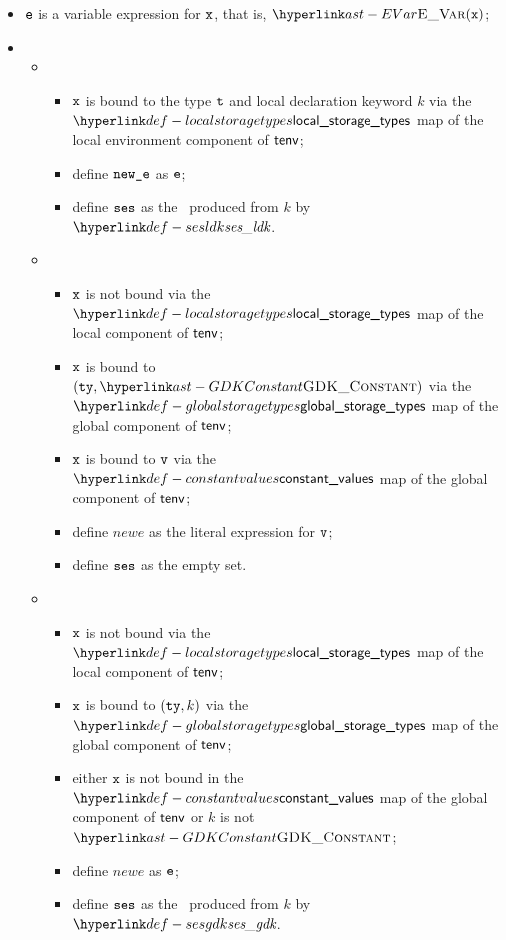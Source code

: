 \ProseParagraph
\AllApply
\begin{itemize}
  \item $\texttt{e}$ is a variable expression for $\texttt{x}$, that is, $\EVar(\vx)$;
  \item \OneApplies
  \begin{itemize}
    \item {}
    \begin{itemize}
    \item $\texttt{x}$ is bound to the type $\texttt{t}$ and local declaration keyword $k$
          via the \\
          $\localstoragetypes$ map of the local environment component of $\textsf{tenv}$;
    \item define $\texttt{new\_e}$ as $\texttt{e}$;
    \item define $\texttt{ses}$ as the \sideeffectsetterm\ produced from $k$ by $\sesldk$.
    \end{itemize}

    \item {}
    \begin{itemize}
    \item $\texttt{x}$ is not bound via the $\localstoragetypes$ map of the local component of $\textsf{tenv}$;
    \item $\texttt{x}$ is bound to $(\tty, \GDKConstant)$ via the $\globalstoragetypes$ map of the global component of $\textsf{tenv}$;
    \item $\texttt{x}$ is bound to $\texttt{v}$ via the $\constantvalues$ map of the global component of $\textsf{tenv}$;
    \item define $newe$ as the literal expression for $\texttt{v}$;
    \item define $\texttt{ses}$ as the empty set.
    \end{itemize}

    \item {}
    \begin{itemize}
      \item $\texttt{x}$ is not bound via the $\localstoragetypes$ map of the local component of $\textsf{tenv}$;
      \item $\texttt{x}$ is bound to $(\texttt{ty}, k)$ via the $\globalstoragetypes$ map of the global component of $\textsf{tenv}$;
      \item either $\texttt{x}$ is not bound in the $\constantvalues$ map of the global component of $\textsf{tenv}$ or $k$ is not $\GDKConstant$;
      \item define $newe$ as $\texttt{e}$;
      \item define $\texttt{ses}$ as the \sideeffectsetterm\ produced from $k$ by $\sesgdk$.
    \end{itemize}


\end{itemize}
\end{itemize}
